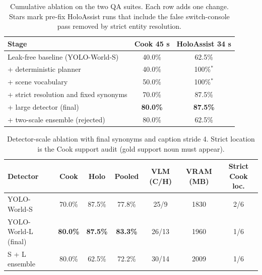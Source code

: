 \begin{table}[t]
  \centering
  \caption{Cumulative ablation on the two QA suites. Each row adds one change.
  Stars mark pre-fix HoloAssist runs that include the false switch-console pass
  removed by strict entity resolution.}
  \label{tab:ablation}
  \begin{tabular}{lcc}
    \toprule
    Stage & Cook 45 s & HoloAssist 34 s \\
    \midrule
    Leak-free baseline (YOLO-World-S) & 40.0\% & 62.5\% \\
    + deterministic planner & 40.0\% & 100\%$^{*}$ \\
    + scene vocabulary & 50.0\% & 100\%$^{*}$ \\
    + strict resolution and fixed synonyms & 70.0\% & 87.5\% \\
    + large detector (final) & \textbf{80.0\%} & \textbf{87.5\%} \\
    + two-scale ensemble (rejected) & 80.0\% & 62.5\% \\
    \bottomrule
  \end{tabular}
\end{table}

\begin{table}[t]
  \centering
  \caption{Detector-scale ablation with final synonyms and caption stride 4.
  Strict location is the Cook support audit (gold support noun must appear).}
  \label{tab:detector-scale}
  \begin{tabular}{lcccccc}
    \toprule
    Detector & Cook & Holo & Pooled & VLM (C/H) & VRAM (MB) & Strict Cook loc. \\
    \midrule
    YOLO-World-S & 70.0\% & 87.5\% & 77.8\% & 25/9 & 1830 & 2/6 \\
    YOLO-World-L (final) & \textbf{80.0\%} & \textbf{87.5\%} & \textbf{83.3\%} & 26/13 & 1960 & 1/6 \\
    S + L ensemble & 80.0\% & 62.5\% & 72.2\% & 30/14 & 2009 & 1/6 \\
    \bottomrule
  \end{tabular}
\end{table}
